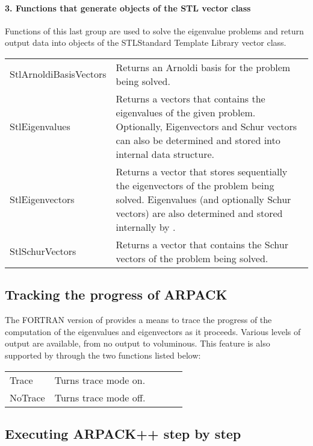 \paragraph{3. Functions that generate objects of the STL vector class}

Functions of this last group are used to solve the eigenvalue problems and return output data into objects of the STLStandard Template Library vector class.

\begin{tabularx}{\textwidth}{LX}
	StlArnoldiBasisVectors & Returns an Arnoldi basis for the problem being solved.\\
	StlEigenvalues & Returns a vectors that contains the eigenvalues of the given problem. Optionally, Eigenvectors and Schur vectors can also be determined and stored into \ARPP{} internal data structure.\\
	StlEigenvectors & Returns a vector that stores sequentially the eigenvectors of the problem being solved. Eigenvalues (and optionally Schur vectors) are also determined and stored internally by \ARPP{}.\\
	StlSchurVectors & Returns a vector that contains the Schur vectors of the problem being solved.\\
\end{tabularx}

\subsection{Tracking the progress of ARPACK}

The FORTRAN version of \ARP{} provides a means to trace the progress of the computation of the eigenvalues and eigenvectors as it proceeds. Various levels of output are available, from no output to voluminous. This feature is also supported by \ARPP{} through the two functions listed below: 

\begin{tabularx}{\textwidth}{LX}
	Trace & Turns trace mode on.\\
	NoTrace & Turns trace mode off. \hspace{8cm} \ \ \ \ \ \ \\
\end{tabularx}

\subsection{Executing ARPACK++ step by step}

